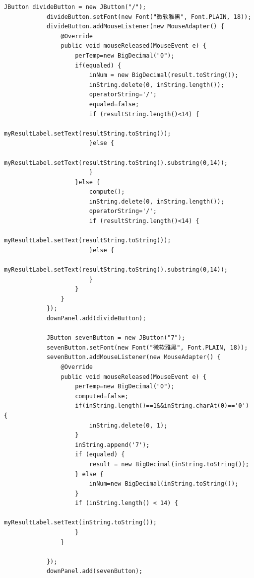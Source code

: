 \documentclass{ctexart}
\begin{document}
\begin{lstlisting}[caption=冗杂的代码]
            JButton divideButton = new JButton("/");
            divideButton.setFont(new Font("微软雅黑", Font.PLAIN, 18));
            divideButton.addMouseListener(new MouseAdapter() {
                @Override
                public void mouseReleased(MouseEvent e) {
                    perTemp=new BigDecimal("0");
                    if(equaled) {
                        inNum = new BigDecimal(result.toString());
                        inString.delete(0, inString.length());
                        operatorString='/';
                        equaled=false;
                        if (resultString.length()<14) {
                            myResultLabel.setText(resultString.toString());
                        }else {
                            myResultLabel.setText(resultString.toString().substring(0,14));
                        }
                    }else {
                        compute();
                        inString.delete(0, inString.length());
                        operatorString='/';
                        if (resultString.length()<14) {
                            myResultLabel.setText(resultString.toString());
                        }else {
                            myResultLabel.setText(resultString.toString().substring(0,14));
                        }
                    }		
                }
            });
            downPanel.add(divideButton);
            
            JButton sevenButton = new JButton("7");
            sevenButton.setFont(new Font("微软雅黑", Font.PLAIN, 18));
            sevenButton.addMouseListener(new MouseAdapter() {
                @Override
                public void mouseReleased(MouseEvent e) {
                    perTemp=new BigDecimal("0");
                    computed=false;
                    if(inString.length()==1&&inString.charAt(0)=='0') {
                        inString.delete(0, 1);
                    }
                    inString.append('7');
                    if (equaled) {
                        result = new BigDecimal(inString.toString());		
                    } else {
                        inNum=new BigDecimal(inString.toString());
                    }
                    if (inString.length() < 14) {
                            myResultLabel.setText(inString.toString());
                    } 
                }
            
            });
            downPanel.add(sevenButton);
            

\end{lstlisting}
\end{document}
